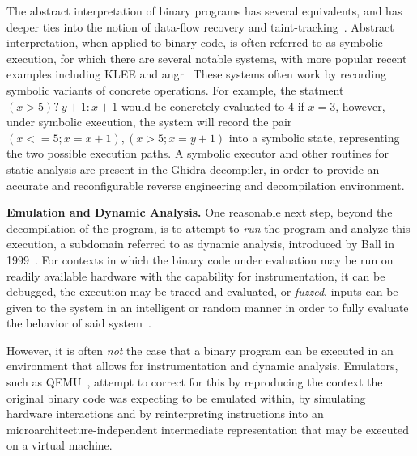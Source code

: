 The abstract interpretation of binary programs has several equivalents, and has deeper ties into the notion of data-flow recovery and taint-tracking~\cite{schwartz2010all}.
Abstract interpretation, when applied to binary code, is often referred to as symbolic execution, for which there are several notable systems, with more popular recent examples including KLEE and angr~\cite{cadar2008klee,wang2017angr}
These systems often work by recording symbolic variants of concrete operations.
For example, the statment $(x > 5) ?\ y + 1 : x + 1$ would be concretely evaluated to 4 if $x = 3$, however, under symbolic execution, the system will record the pair $(x<=5; x=x+1),(x>5;x=y+1)$ into a symbolic state, representing the two possible execution paths.
A symbolic executor and other routines for static analysis are present in the Ghidra decompiler, in order to provide an accurate and reconfigurable reverse engineering and decompilation environment.

\textbf{Emulation and Dynamic Analysis.} One reasonable next step, beyond the decompilation of the program, is to attempt to \emph{run} the program and analyze this execution, a subdomain referred to as dynamic analysis, introduced by Ball in 1999~\cite{ball1999concept}.
For contexts in which the binary code under evaluation may be run on readily available hardware with the capability for instrumentation, it can be debugged, the execution may be traced and evaluated, or \emph{fuzzed}, inputs can be given to the system in an intelligent or random manner in order to fully evaluate the behavior of said system~\cite{li2018fuzzing}.

However, it is often \emph{not} the case that a binary program can be executed in an environment that allows for instrumentation and dynamic analysis.
Emulators, such as QEMU~\cite{bellard2005qemu}, attempt to correct for this by reproducing the context the original binary code was expecting to be emulated within, by simulating hardware interactions and by reinterpreting instructions into an microarchitecture-independent intermediate representation that may be executed on a virtual machine.

